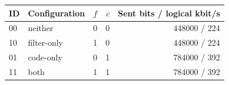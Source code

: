 \begin{tabular}{llrrr}
\toprule
ID & Configuration & $f$ & $c$ & Sent bits / logical kbit/s \\
\midrule
00 & neither & 0 & 0 & 448000 / 224 \\
10 & filter-only & 1 & 0 & 448000 / 224 \\
01 & code-only & 0 & 1 & 784000 / 392 \\
11 & both & 1 & 1 & 784000 / 392 \\
\bottomrule
\end{tabular}
